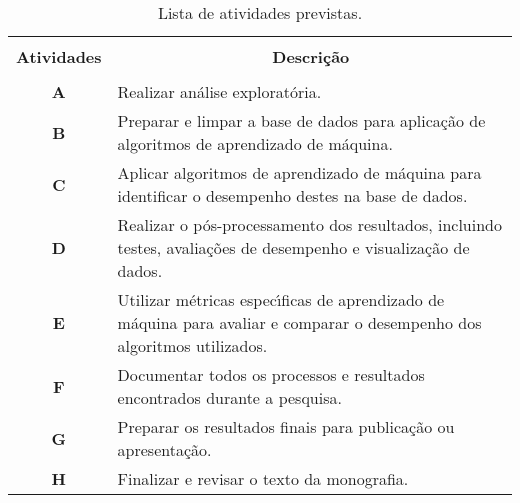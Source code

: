 \documentclass[tcc1,project]{uftex}
\begin{document}
\begin{table}[!h]
  \centering
  \caption{Lista de atividades previstas.}\label{tb:atividades}
  \begin{tabular}{cp{9.4cm}}
    \hline \hline &\\[-0.4cm]
    {\bf Atividades} & \multicolumn{1}{c}{\bf Descrição} \\
    \hline
    &\\[-0.4cm]
    \textbf{A} &  Realizar análise exploratória. \\[0.2cm]
    \textbf{B} &  Preparar e limpar a base de dados para aplicação de algoritmos de aprendizado de máquina.\\[0.2cm]
    \textbf{C} &  Aplicar algoritmos de aprendizado de máquina para identificar o desempenho destes na base de dados.\\[0.2cm]
    \textbf{D} &  Realizar o pós-processamento dos resultados, incluindo testes, avaliações de desempenho e visualização de dados. \\[0.2cm]
    \textbf{E} &  Utilizar métricas especı́ficas de aprendizado de máquina para avaliar e comparar o desempenho dos algoritmos utilizados. \\[0.2cm]
    \textbf{F} &  Documentar todos os processos e resultados encontrados durante a pesquisa.\\[0.2cm]
    \textbf{G} &  Preparar os resultados finais para publicação ou apresentação.\\[0.2cm]
    \textbf{H} &  Finalizar e revisar o texto da monografia.\\[0.2cm]
    \hline \hline
  \end{tabular}
\end{table}



\end{document}
